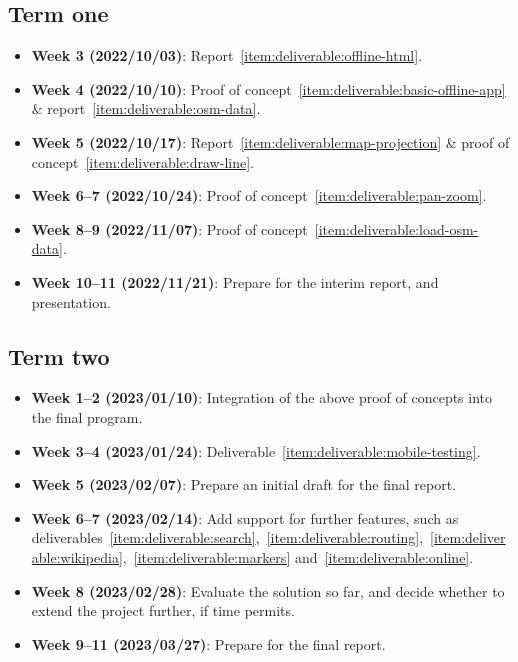 \documentclass{final_report}
\begin{document}
\subsection{Term one}\label{sec:term-1-plan}

\begin{itemize}
    \item \textbf{Week 3 (2022/10/03)}: Report~\ref{item:deliverable:offline-html}.
    \item \textbf{Week 4 (2022/10/10)}: Proof of concept~\ref{item:deliverable:basic-offline-app} \& report~\ref{item:deliverable:osm-data}.
    \item \textbf{Week 5 (2022/10/17)}: Report~\ref{item:deliverable:map-projection} \& proof of concept~\ref{item:deliverable:draw-line}.
    \item \textbf{Week 6--7 (2022/10/24)}: Proof of concept~\ref{item:deliverable:pan-zoom}.
    \item \textbf{Week 8--9 (2022/11/07)}: Proof of concept~\ref{item:deliverable:load-osm-data}.
    \item \textbf{Week 10--11 (2022/11/21)}: Prepare for the interim report, and presentation.
\end{itemize}

\subsection{Term two}

\begin{itemize}
    \item \textbf{Week 1--2 (2023/01/10)}: Integration of the above proof of concepts into the final program.
    \item \textbf{Week 3--4 (2023/01/24)}: Deliverable~\ref{item:deliverable:mobile-testing}.
    \item \textbf{Week 5 (2023/02/07)}: Prepare an initial draft for the final report.
    \item \textbf{Week 6--7 (2023/02/14)}: Add support for further features, such as deliverables~\ref{item:deliverable:search},~\ref{item:deliverable:routing},~\ref{item:deliverable:wikipedia},~\ref{item:deliverable:markers} and~\ref{item:deliverable:online}.
    \item \textbf{Week 8 (2023/02/28)}: Evaluate the solution so far, and decide whether to extend the project further, if time permits.
    \item \textbf{Week 9--11 (2023/03/27)}: Prepare for the final report.
\end{itemize}
\end{document}
